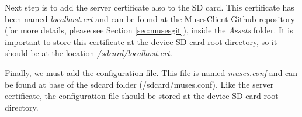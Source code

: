 Next step is to add the server certificate also to the SD card. This certificate has been named \textit{localhost.crt} and can be found at the MusesClient Github repository (for more details, please see Section \ref{sec:musesgit}), inside the \textit{Assets} folder. It is important to store this certificate at the device SD card root directory, so it should be at the location \textit{/sdcard/localhost.crt}.

Finally, we must add the configuration file. This file is named \textit{muses.conf} and can be found at base of the sdcard folder (/sdcard/muses.conf). Like the server certificate, the configuration file should be stored at the device SD card root directory.





